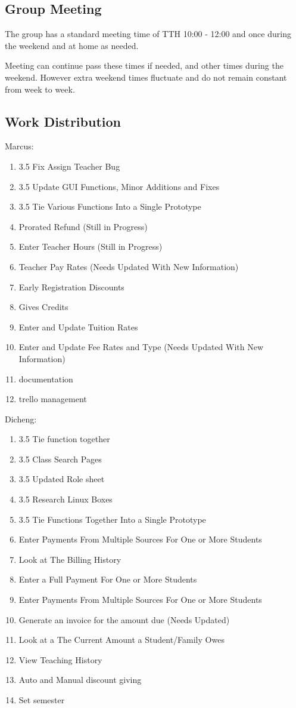 \subsection{Group Meeting}

The group has a standard meeting time of TTH 10:00 - 12:00 and once during the weekend and at home as needed.  

Meeting can continue pass these times if needed, and other times during the weekend. However extra weekend times fluctuate and do not remain constant from week to week. 

\subsection{Work Distribution}

Marcus:
\begin{enumerate}
\item 3.5 Fix Assign Teacher Bug
\item 3.5 Update GUI Functions, Minor Additions and Fixes
\item 3.5 Tie Various Functions Into a Single Prototype
\item Prorated Refund (Still in Progress)
\item Enter Teacher Hours (Still in Progress)
\item Teacher Pay Rates (Needs Updated With New Information)
\item Early Registration Discounts
\item Gives Credits
\item Enter and Update Tuition Rates
\item Enter and Update Fee Rates and Type (Needs Updated With New Information)
\item documentation
\item trello management\\
\end{enumerate}

Dicheng:
\begin{enumerate}
\item 3.5 Tie function together
\item 3.5 Class Search Pages
\item 3.5 Updated Role sheet
\item 3.5 Research Linux Boxes
\item 3.5 Tie Functions Together Into a Single Prototype
\item Enter Payments From Multiple Sources For One or More Students
\item Look at The Billing History
\item Enter a Full Payment For One or More Students
\item Enter Payments From Multiple Sources For One or More Students
\item Generate an invoice for the amount due (Needs Updated)
\item Look at a The Current Amount a Student/Family Owes
\item View Teaching History
\item Auto and Manual discount giving
\item Set semester
\end{enumerate}


